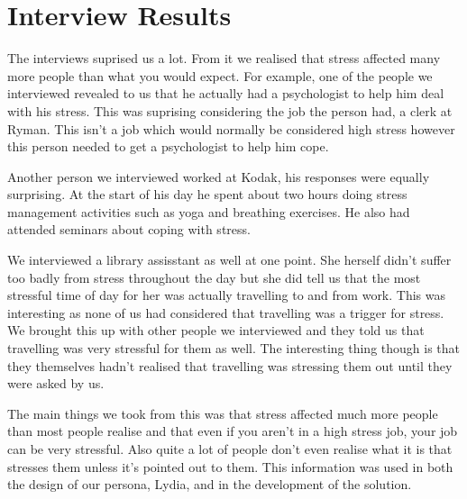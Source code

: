 \documentclass{scrartcl}
\begin{document}

\section{Interview Results}
The interviews suprised us a lot. From it we realised that stress
affected many more people than what you would expect. For example, 
one of the people we interviewed revealed to us that he actually
had a psychologist to help him deal with his stress. This was
suprising considering the job the person had, a clerk at Ryman.
This isn't a job which would normally be considered high stress
however this person needed to get a psychologist to help him cope.

Another person we interviewed worked at Kodak, his responses were 
equally surprising. At the start of his day he spent about two hours
doing stress management activities such as yoga and breathing exercises.
He also had attended seminars about coping with stress.

We interviewed a library assisstant as well at one point. She 
herself didn't suffer too badly from stress throughout the day
but she did tell us that the most stressful time of day for her was
actually travelling to and from work. This was interesting as
none of us had considered that travelling was a trigger for stress.
We brought this up with other people we interviewed and they told
us that travelling was very stressful for them as well. The
interesting thing though is that they themselves hadn't realised
that travelling was stressing them out until they were asked by
us.

The main things we took from this was that stress affected much
more people than most people realise and that even if you aren't
in a high stress job, your job can be very stressful. Also 
quite a lot of people don't even realise what it is that stresses
them unless it's pointed out to them. This information was used
in both the design of our persona, Lydia, and in the development 
of the solution.
\end{document}

